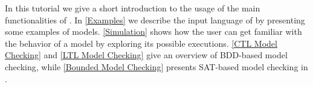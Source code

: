 In this tutorial we give a short introduction to the usage of the main
functionalities of \nusmv. 
In \cref{Examples} we describe the input language of \nusmv by
presenting some examples of \nusmv models.
\cref{Simulation} shows how the user can get familiar with the behavior
of a \nusmv model by exploring its possible executions.
\cref{CTL Model Checking} and \cref{LTL Model Checking} give an overview
of BDD-based model checking, while \cref{Bounded Model Checking} presents
SAT-based model checking in \nusmv.
